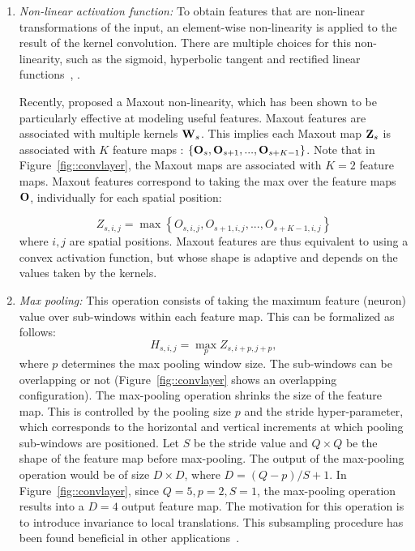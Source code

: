 \documentclass[final,5p,times,twocolumn]{elsarticle}
\begin{document}
\begin{enumerate}
\item {\it Non-linear activation function:} To obtain features that are non-linear transformations of the input, an element-wise non-linearity is applied to the result of the kernel convolution. There are multiple choices for this non-linearity, such as the sigmoid, hyperbolic tangent and rectified linear functions~\citep{jarrett2009}, \citep{glorot2011}. 

Recently, \citet{Goodfellow_maxout_2013} proposed a Maxout non-linearity, which has been shown to be particularly effective at modeling useful features. Maxout features are associated with multiple kernels ${\bf W}_{s}$.  This implies each Maxout map ${\bf Z}_{s}$ is associated with $K$ feature maps : $\left \{ {\bf O}_s, {\bf O}_{s+1},...,{\bf O}_{s+K-1} \right \}$. Note that in Figure~\ref{fig::convlayer}, the Maxout maps are associated with $K = 2$ feature maps.  Maxout features correspond to taking the max over the feature maps ${\bf O}$, individually for each spatial position:

\begin{equation}
Z_{s,i,j} = \max \left \{ O_{s,i,j}, O_{s+1,i,j},..., O_{s+K-1,i,j} \right \}
\end{equation}
where $i,j$ are spatial positions. Maxout features are thus equivalent to using a convex activation function, but whose shape is adaptive and depends on the values taken by the kernels.


\item {\it Max pooling:} This operation consists of taking the maximum feature (neuron) value over sub-windows within each feature map. This can be formalized as follows:
\begin{equation}
H_{s,i,j} = \max_{p} Z_{s,i+p,j+p} , 
\end{equation} 
where $p$ determines the max pooling window size.  The sub-windows can be overlapping or not (Figure~\ref{fig::convlayer} shows an overlapping configuration). The max-pooling operation shrinks the size of the feature map. This is controlled by the pooling size $p$ and the stride hyper-parameter, which corresponds to the horizontal and vertical increments at which pooling sub-windows are positioned. Let $S$ be the stride value and $Q\times Q$ be the shape of the feature map before max-pooling. The output of the max-pooling operation would be of size $D \times D$, where $D = (Q-p)/S+1$.  In Figure~\ref{fig::convlayer}, since $Q=5, p=2, S=1$, the max-pooling operation results into a $D=4$ output feature map.
The motivation for this operation is to introduce invariance to local translations. This subsampling procedure has been found beneficial in other applications~\citep{Krizhevsky-2012-small}. 


\end{enumerate}
\end{document}

